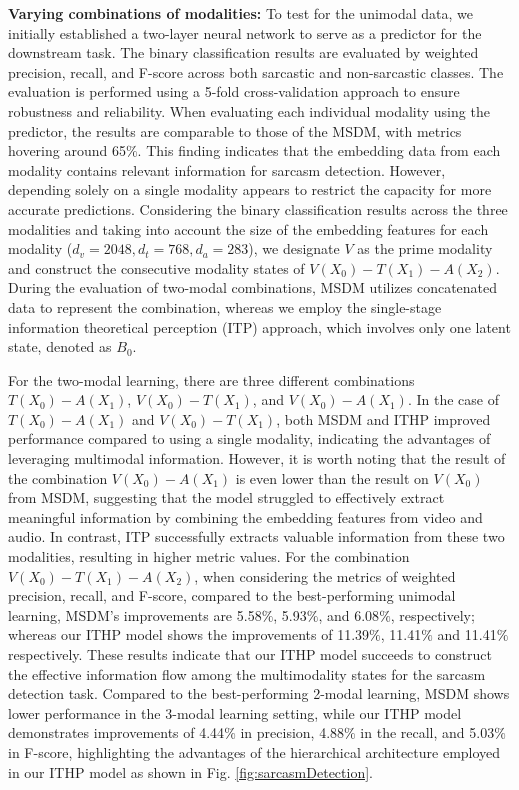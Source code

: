 \documentclass{article} %
\begin{document}
\textbf{Varying combinations of modalities:} To test for the unimodal data, we initially established a two-layer neural network to serve as a predictor for the downstream task. The binary classification results are evaluated by weighted precision, recall, and F-score across both sarcastic and non-sarcastic classes. The evaluation is performed using a 5-fold cross-validation approach to ensure robustness and reliability. When evaluating each individual modality using the predictor, the results are comparable to those of the MSDM, with metrics hovering around 65$\%$. This finding indicates that the embedding data from each modality contains relevant information for sarcasm detection. However, depending solely on a single modality appears to restrict the capacity for more accurate predictions. Considering the binary classification results across the three modalities and taking into account the size of the embedding features for each modality ($d_v=2048, d_t=768, d_a=283$), we designate $V$ as the prime modality and construct the consecutive modality states of $V (X_0)-T (X_1) - A (X_2)$. During the evaluation of two-modal combinations, MSDM utilizes concatenated data to represent the combination, whereas we employ the single-stage information theoretical perception (ITP) approach, which involves only one latent state, denoted as $B_0$. 

For the two-modal learning, there are three different combinations $T (X_0)-A (X_1)$, $V (X_0)-T (X_1)$, and $V (X_0)-A (X_1)$. In the case of $T (X_0)-A (X_1)$ and $V (X_0)-T (X_1)$, both MSDM and ITHP improved performance compared to using a single modality, indicating the advantages of leveraging multimodal information. However, it is worth noting that the result of the combination $V (X_0)-A (X_1)$ is even lower than the result on $V (X_0)$ from MSDM, suggesting that the model struggled to effectively extract meaningful information by combining the embedding features from video and audio. 
In contrast, ITP successfully extracts valuable information from these two modalities, resulting in higher metric values. For the combination $V (X_0)-T (X_1) - A (X_2)$, when considering the metrics of weighted precision, recall, and F-score, compared to the best-performing unimodal learning, MSDM's improvements are 5.58$\%$, 5.93$\%$, and 6.08$\%$, respectively; whereas our ITHP model shows the improvements of 11.39$\%$, 11.41$\%$ and 11.41$\%$ respectively. These results indicate that our ITHP model succeeds to construct the effective information flow among the multimodality states for the sarcasm detection task. Compared to the best-performing 2-modal learning, MSDM shows lower performance in the 3-modal learning setting, while our ITHP model demonstrates improvements of 4.44$\%$ in precision, 4.88$\%$ in the recall, and 5.03$\%$ in F-score, highlighting the advantages of the hierarchical architecture employed in our ITHP model as shown in Fig. \ref{fig:sarcasmDetection}.
\end{document}
